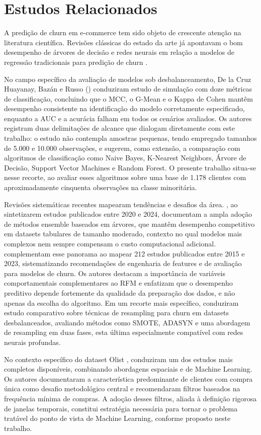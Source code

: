 \FloatBarrier
\section{Estudos Relacionados} \label{sec:estudos-relacionados}

A predição de churn em e-commerce tem sido objeto de crescente atenção na literatura científica. Revisões clássicas do estado da arte já apontavam o bom desempenho de árvores de decisão e redes neurais em relação a modelos de regressão tradicionais para predição de churn \cite{hadden2007}.

No campo específico da avaliação de modelos sob desbalanceamento, De la Cruz Huayanay, Bazán e Russo (\citeyear{delacruz2025}) conduziram estudo de simulação com doze métricas de classificação, concluindo que o MCC, o G-Mean e o Kappa de Cohen mantêm desempenho consistente na identificação do modelo corretamente especificado, enquanto a AUC e a acurácia falham em todos os cenários avaliados. Os autores registram duas delimitações de alcance que dialogam diretamente com este trabalho: o estudo não contempla amostras pequenas, tendo empregado tamanhos de 5.000 e 10.000 observações, e sugerem, como extensão, a comparação com algoritmos de classificação como Naive Bayes, K-Nearest Neighbors, Árvore de Decisão, Support Vector Machines e Random Forest. O presente trabalho situa-se nesse recorte, ao avaliar esses algoritmos sobre uma base de 1.178 clientes com aproximadamente cinquenta observações na classe minoritária.

Revisões sistemáticas recentes mapearam tendências e desafios da área. , ao sintetizarem estudos publicados entre 2020 e 2024, documentam a ampla adoção de métodos ensemble baseados em árvores, que mantêm desempenho competitivo em datasets tabulares de tamanho moderado, contexto no qual modelos mais complexos nem sempre compensam o custo computacional adicional.  complementam esse panorama ao mapear 212 estudos publicados entre 2015 e 2023, sistematizando recomendações de engenharia de features e de avaliação para modelos de churn. Os autores destacam a importância de variáveis comportamentais complementares ao RFM e enfatizam que o desempenho preditivo depende fortemente da qualidade da preparação dos dados, e não apenas da escolha do algoritmo. Em um recorte mais específico,  conduziram estudo comparativo sobre técnicas de resampling para churn em datasets desbalanceados, avaliando métodos como SMOTE, ADASYN e uma abordagem de resampling em duas fases, esta última especialmente compatível com redes neurais profundas.

No contexto específico do dataset Olist \cite{olist2018},  conduziram um dos estudos mais completos disponíveis, combinando abordagens espaciais e de Machine Learning. Os autores documentaram a característica predominante de clientes com compra única como desafio metodológico central e recomendaram filtros baseados na frequência mínima de compras. A adoção desses filtros, aliada à definição rigorosa de janelas temporais, constitui estratégia necessária para tornar o problema tratável do ponto de vista de Machine Learning, conforme proposto neste trabalho.

\FloatBarrier
